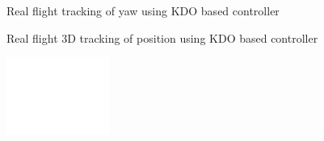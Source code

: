 \documentclass[letterpaper%
, twoside%
, 12pt%
,memoire%
, english%
,creativecommons,hyperref%
]{thETS}
\theoremstyle{newThmStyle}
\begin{document}
\begin{figure}[H]
	\centering
	\parbox{0.85\textwidth}{\caption{Real flight tracking of yaw using KDO based controller\label{Fig:yawtracKDO}}}
\end{figure}
\begin{figure}[H]
	\centering
	\parbox{0.65\textwidth}{\caption{Real flight 3D tracking of position using KDO based controller\label{Fig:3dKDO}}}
\end{figure}
\begin{figure}[H]
	\includegraphics[width=0.3\textwidth]{Figures/blank.png}
\end{figure}
\FloatBarrier
\end{document}
